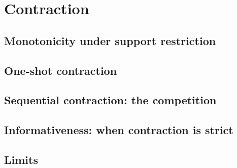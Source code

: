 
\section{Contraction}
\label{p2:sec:contraction}

\subsection{Monotonicity under support restriction}
\label{p2:sub:monotonicity_under_restriction}

\subsection{One-shot contraction}
\label{p2:sub:one_shot_contraction}

\subsection{Sequential contraction: the competition}
\label{p2:sub:sequential_contraction}

\subsection{Informativeness: when contraction is strict}
\label{p2:sub:informativeness}

\subsection{Limits}
\label{p2:sub:contraction_limits}
